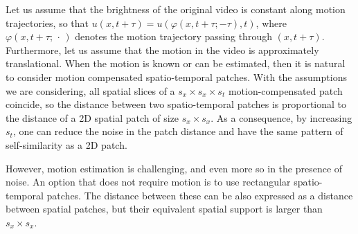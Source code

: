 \documentclass[10pt, journal, twocolumn, final, a4paper]{IEEEtran}
\begin{document}
Let us assume that 
the brightness of the original video is constant along motion trajectories, so
that $u(x,t + \tau) = u(\varphi(x,t + \tau; -\tau),t)$, where
$\varphi(x,t+\tau;\, \cdot\, )$ denotes the motion trajectory passing through
$(x,t + \tau)$.
Furthermore, let us assume that the motion in the video is approximately
translational.
When the motion is known or can be estimated, then it is natural to consider
motion compensated spatio-temporal patches. 
With the assumptions we are considering, all spatial slices of a $s_x\times s_x\times s_t$ motion-compensated patch
coincide, so the distance between two spatio-temporal patches is proportional to
the distance of a 2D spatial patch of size $s_x\times s_x$.
%
As a consequence, by increasing $s_t$, one can reduce the 
noise in the patch distance and have the same pattern of self-similarity as a 
2D patch.

However, motion estimation is challenging, and even more so in the presence of noise.
An option that does not require motion is to use rectangular spatio-temporal patches.
The distance between these can be also expressed as a distance between spatial patches,
but their equivalent spatial support is larger than $s_x\times s_x$.
\end{document}
